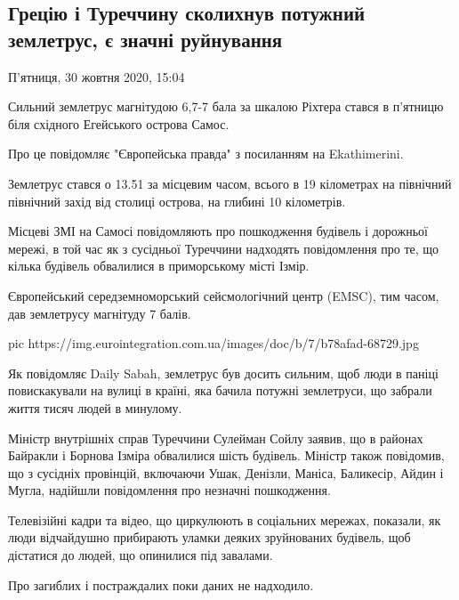  
 
 

\subsection{Грецію і Туреччину сколихнув потужний землетрус, є значні руйнування}

П'ятниця, 30 жовтня 2020, 15:04

Сильний землетрус магнітудою 6,7-7 бала за шкалою Ріхтера стався в п'ятницю
біля східного Егейського острова Самос.

Про це повідомляє "Європейська правда" з посиланням на Ekathimerini.

Землетрус стався о 13.51 за місцевим часом, всього в 19 кілометрах на північний
північний захід від столиці острова, на глибині 10 кілометрів.

Місцеві ЗМІ на Самосі повідомляють про пошкодження будівель і дорожньої мережі,
в той час як з сусідньої Туреччини надходять повідомлення про те, що кілька
будівель обвалилися в приморському місті Ізмір.

Європейський середземноморський сейсмологічний центр (EMSC), тим часом, дав
землетрусу магнітуду 7 балів.

\ifcmt
pic https://img.eurointegration.com.ua/images/doc/b/7/b78afad-68729.jpg
\fi

Як повідомляє Daily Sabah, землетрус був досить сильним, щоб люди в паніці
повискакували на вулиці в країні, яка бачила потужні землетруси, що забрали
життя тисяч людей в минулому.

Міністр внутрішніх справ Туреччини Сулейман Сойлу заявив, що в районах Байракли
і Борнова Ізміра обвалилися шість будівель. Міністр також повідомив, що з
сусідніх провінцій, включаючи Ушак, Денізли, Маніса, Баликесір, Айдин і Мугла,
надійшли повідомлення про незначні пошкодження.

Телевізійні кадри та відео, що циркулюють в соціальних мережах, показали, як
люди відчайдушно прибирають уламки деяких зруйнованих будівель, щоб дістатися
до людей, що опинилися під завалами.

Про загиблих і постраждалих поки даних не надходило.
